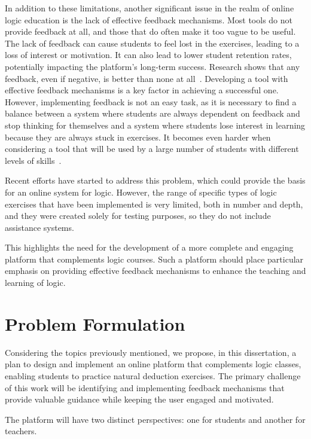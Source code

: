 In addition to these limitations, another significant issue in the realm of online logic education is the lack of effective feedback mechanisms. Most tools do not provide feedback at all, and those that do often make it too vague to be useful. The lack of feedback can cause students to feel lost in the exercises, leading to a loss of interest or motivation. It can also lead to lower student retention rates, potentially impacting the platform's long-term success. Research shows that any feedback, even if negative, is better than none at all~\cite{Zhu2022AnyFI}. Developing a tool with effective feedback mechanisms is a key factor in achieving a successful one. However, implementing feedback is not an easy task, as it is necessary to find a balance between a system where students are always dependent on feedback and stop thinking for themselves and a system where students lose interest in learning because they are always stuck in exercises. It becomes even harder when considering a tool that will be used by a large number of students with different levels of skills~\cite{Cavalcanti2019AnAO}.

Recent efforts have started to address this problem, which could provide the basis for an online system for logic. However, the range of specific types of logic exercises that have been implemented is very limited, both in number and depth, and they were created solely for testing purposes, so they do not include assistance systems.

This highlights the need for the development of a more complete and engaging platform that complements logic courses. Such a platform should place particular emphasis on providing effective feedback mechanisms to enhance the teaching and learning of logic.

\section{Problem Formulation}
\label{tab:problem_formulation}
Considering the topics previously mentioned, we propose, in this dissertation, a plan to design and implement an online platform that complements logic classes, enabling students to practice natural deduction exercises. The primary challenge of this work will be identifying and implementing feedback mechanisms that provide valuable guidance while keeping the user engaged and motivated. 

The platform will have two distinct perspectives: one for students and another for teachers.

